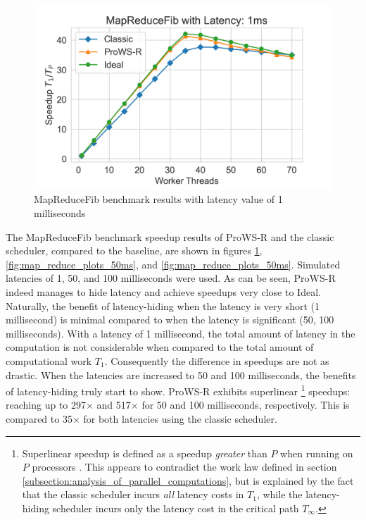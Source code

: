\documentclass[bsc,frontabs,singlespacing,parskip,deptreport,normalheadings]{infthesis}
\begin{document}
\begin{figure}[ht]
    \centering
    \includegraphics[width=0.8\linewidth]{figures/map_reduce_plot_latency_1.png}
    \caption{MapReduceFib benchmark results with latency value of 1 milliseconds}
    \label{fig:map_reduce_plots_1ms}
\end{figure}

The MapReduceFib benchmark speedup results of ProWS-R and the classic scheduler,
compared to the baseline, are shown in figures \ref{fig:map_reduce_plots_1ms},
\ref{fig:map_reduce_plots_50ms}, and \ref{fig:map_reduce_plots_50ms}. Simulated
latencies of 1, 50, and 100 milliseconds were used. As can be seen, ProWS-R
indeed manages to hide latency and achieve speedups very close to Ideal.
Naturally, the benefit of latency-hiding when the latency is very short (1
millisecond) is minimal compared to when the latency is significant (50, 100
milliseconds). With a latency of 1 millisecond, the total amount of latency in
the computation is not considerable when compared to the total amount of
computational work \(T_1\). Consequently the difference in speedups are not as
drastic. When the latencies are increased to 50 and 100 milliseconds, the
benefits of latency-hiding truly start to show. ProWS-R exhibits superlinear
\footnote{Superlinear speedup is defined as a speedup \textit{greater} than
    \(P\) when running on \(P\) processors \cite{ristov_superlinear_2016}. This
    appears to contradict the work law defined in section
    \ref{subsection:analysis_of_parallel_computations}, but is explained by the
    fact that the classic scheduler incurs \textit{all} latency costs in
    \(T_1\), while the latency-hiding scheduler incurs only the latency cost in
    the critical path \(T_\infty\).} speedups: reaching up to 297\(\times\) and
    517\(\times\) for 50 and 100 milliseconds, respectively. This is compared to
    35\(\times\) for both latencies using the classic scheduler.
\end{document}
